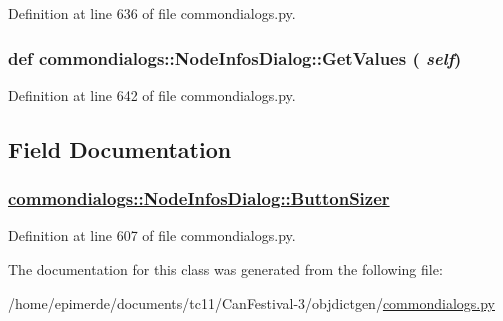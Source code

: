 Definition at line 636 of file commondialogs.py.\hypertarget{classcommondialogs_1_1NodeInfosDialog_ca7599893a8bfbe3d0b8afca376e9353}{
\subsubsection[GetValues]{\setlength{\rightskip}{0pt plus 5cm}def commondialogs::Node\-Infos\-Dialog::Get\-Values ( {\em self})}}
\label{classcommondialogs_1_1NodeInfosDialog_ca7599893a8bfbe3d0b8afca376e9353}




Definition at line 642 of file commondialogs.py.

\subsection{Field Documentation}
\hypertarget{classcommondialogs_1_1NodeInfosDialog_854b2423bc12e5c04c1e2cb5a683a72f}{
\subsubsection[ButtonSizer]{\setlength{\rightskip}{0pt plus 5cm}\hyperlink{classcommondialogs_1_1NodeInfosDialog_854b2423bc12e5c04c1e2cb5a683a72f}{commondialogs::Node\-Infos\-Dialog::Button\-Sizer}}}
\label{classcommondialogs_1_1NodeInfosDialog_854b2423bc12e5c04c1e2cb5a683a72f}




Definition at line 607 of file commondialogs.py.

The documentation for this class was generated from the following file:\begin{CompactItemize}
\item 
/home/epimerde/documents/tc11/Can\-Festival-3/objdictgen/\hyperlink{commondialogs_8py}{commondialogs.py}\end{CompactItemize}

